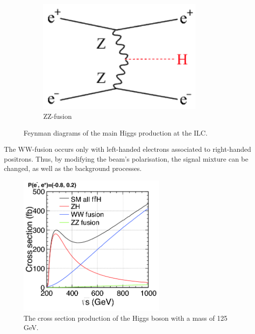 \begin{figure}
\begin{subfigure}[t]{0.3\textwidth}
            \includegraphics[width = 0.9\textwidth]{Pictures/Higgs/HiggsProd_eeH.png}
            \caption{ZZ-fusion}
            \label{fig:ZZ-fusion}
        \end{subfigure}
        \caption{Feynman diagrams of the main Higgs production at the ILC\cite{Asner2013}\cite{tian}.}
        \label{fig:higgsProduction}
    \end{figure}    
    
    The WW-fusion occurs only with left-handed electrons associated to right-handed positrons.
    Thus, by modifying the beam's polarisation, the signal mixture can be changed, as well as the background processes.

    \begin{figure}[!h]
      \centering
      \includegraphics[width = 0.65\textwidth]{Pictures/Higgs/higgs_xsec_P-8_3.png}
      \caption{The cross section production of the Higgs boson with a mass of 125 GeV\cite{Asner2013}.}
      \label{fig:higgsXsec}
    \end{figure}

